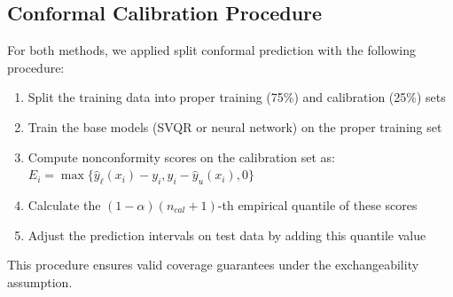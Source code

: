 \documentclass{article}
\begin{document}
\subsection{Conformal Calibration Procedure}
For both methods, we applied split conformal prediction with the following procedure:
\begin{enumerate}
    \item Split the training data into proper training (75\%) and calibration (25\%) sets
    \item Train the base models (SVQR or neural network) on the proper training set
    \item Compute nonconformity scores on the calibration set as:\\
          $E_i = \max\{\hat{y}_{\ell}(x_i) - y_i, y_i - \hat{y}_{u}(x_i), 0\}$
    \item Calculate the $(1-\alpha)(n_{cal}+1)$-th empirical quantile of these scores
    \item Adjust the prediction intervals on test data by adding this quantile value
\end{enumerate}

This procedure ensures valid coverage guarantees under the exchangeability assumption.
\end{document}
